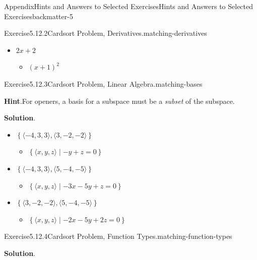 \documentclass[oneside,10pt,]{book}
\newcommand{\blocktitlefont}{\relax}
\numberwithin{equation}{section}
\begin{document}
\begin{solutions-chapter}{Appendix}{Hints and Answers to Selected Exercises}{}{Hints and Answers to Selected Exercises}{}{}{backmatter-5}
\begin{divisionsolution}{Exercise}{5.12.2}{Cardsort Problem, Derivatives.}{matching-derivatives}
\begin{itemize}[label=\textbullet]
\begin{itemize}[label=$\circ$]
\item{}\(x^{-3}\)%
\end{itemize}
%
\item{}\(2x+2\)%
\begin{itemize}[label=$\circ$]
\item{}\((x+1)^2\)%
\end{itemize}
%
\end{itemize}
%
\end{divisionsolution}%
\begin{divisionsolution}{Exercise}{5.12.3}{Cardsort Problem, Linear Algebra.}{matching-bases}%
\par\smallskip%
\noindent\textbf{\blocktitlefont Hint}.\hypertarget{matching-bases-4-back}{}\quad{}For openers, a basis for a subspace must be a \emph{subset} of the subspace.%
\par\smallskip%
\noindent\textbf{\blocktitlefont Solution}.\hypertarget{matching-bases-5-back}{}\quad{}%
\begin{itemize}[label=\textbullet]
\item{}\(\left\{\langle -4, 3, 3\rangle, \langle 3, -2, -2 \rangle\right\}\)%
\begin{itemize}[label=$\circ$]
\item{}\(\left\{\langle x,y,z\rangle\mid - y + z = 0\right\}\)%
\end{itemize}
%
\item{}\(\left\{\langle -4, 3, 3\rangle, \langle 5, -4, -5 \rangle\right\}\)%
\begin{itemize}[label=$\circ$]
\item{}\(\left\{\langle x,y,z\rangle\mid -3x - 5y + z = 0\right\}\)%
\end{itemize}
%
\item{}\(\left\{\langle 3, -2, -2 \rangle, \langle 5, -4, -5 \rangle\right\}\)%
\begin{itemize}[label=$\circ$]
\item{}\(\left\{\langle x,y,z\rangle\mid -2x - 5y + 2z = 0\right\}\)%
\end{itemize}
%
\end{itemize}
%
\end{divisionsolution}%
\begin{divisionsolution}{Exercise}{5.12.4}{Cardsort Problem, Function Types.}{matching-function-types}%
\par\smallskip%
\noindent\textbf{\blocktitlefont Solution}.\hypertarget{matching-function-types-4-back}{}\quad{}%
\begin{itemize}[label=\textbullet]

\end{itemize}
\end{divisionsolution}
\end{solutions-chapter}
\end{document}

